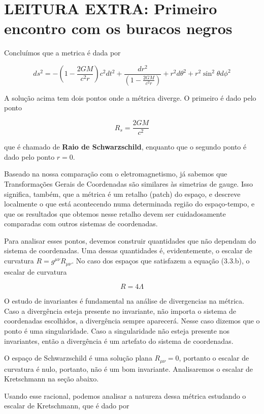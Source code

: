 \documentclass[11pt]{article}
\begin{document}
    \hypertarget{leitura-extra-primeiro-encontro-com-os-buracos-negros}{%
\section{LEITURA EXTRA: Primeiro encontro com os buracos
negros}\label{leitura-extra-primeiro-encontro-com-os-buracos-negros}}

    Concluímos que a metrica é dada por

\[ \tag{5.1} ds^2 = -\left(1 - \frac{2 G M}{c^2 r}\right) c^2 dt^2 + \frac{dr^2}{\left(1 - \frac{2 G M}{c^2 r}\right)} + r^2 d\theta^2 + r^2 \sin^2\theta d\phi^2 \]

    A solução acima tem dois pontos onde a métrica diverge. O primeiro é
dado pelo ponto

\[ \tag{5.2} R_s = \frac{2GM}{c^2}\]

que é chamado de \textbf{Raio de Schwarzschild}, enquanto que o segundo
ponto é dado pelo ponto \(r=0\).

    Baseado na nossa comparação com o eletromagnetismo, já sabemos que
Transformações Gerais de Coordenadas são similares às simetrias de
gauge. Isso significa, também, que a métrica é um retalho (patch) do
espaço, e descreve localmente o que está acontecendo numa determinada
região do espaço-tempo, e que os resultados que obtemos nesse retalho
devem ser cuidadosamente comparadas com outros sistemas de coordenadas.

Para analisar esses pontos, devemos construir quantidades que não
dependam do sistema de coordenadas. Uma dessas quantidades é,
evidentemente, o escalar de curvatura \(R = g^{\mu\nu} R_{\mu\nu}\). No
caso dos espaços que satisfazem a equação (3.3.b), o escalar de
curvatura

\[ \tag{5.3} R = 4 \Lambda \]

O estudo de invariantes é fundamental na análise de divergencias na
métrica. Caso a divergência esteja presente no invariante, não importa o
sistema de coordenadas escolhidos, a divergência sempre aparecerá. Nesse
caso dizemos que o ponto é uma singularidade. Caso a singularidade não
esteja presente nos invariantes, então a divergência é um artefato do
sistema de coordenadas.

O espaço de Schwarzschild é uma solução plana \(R_{\mu\nu}=0\), portanto
o escalar de curvatura é nulo, portanto, não é um bom invariante.
Analisaremos o escalar de Kretschmann na seção abaixo.

Usando esse racional, podemos analisar a natureza dessa métrica
estudando o escalar de Kretschmann, que é dado por
\end{document}
